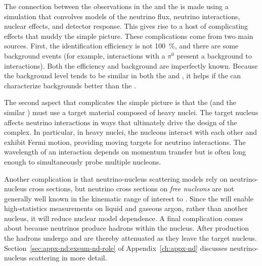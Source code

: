 The connection between the observations in the  and the  is made using a simulation that convolves models of the neutrino flux, neutrino interactions, nuclear effects, and detector response.
This gives rise to a host of complicating effects that 
muddy the simple picture. These complications come from two main sources. First, the identification efficiency is not \SI{100}{\%}, and there are
some background events (for example,  interactions with a $\pi^0$ present %
a background to \nue {} interactions). Both the efficiency and background are imperfectly known. 
Because the background level tends to be similar in both the  and , it helps if the  can characterize backgrounds better than the . 

The second aspect that complicates the simple picture is that the  (and the similar ) must use a target material composed of heavy nuclei. %
The target nucleus affects %
neutrino interactions in ways that ultimately drive the design of the   complex. In particular, in heavy nuclei, the nucleons interact with each other and exhibit Fermi motion, providing moving targets for neutrino interactions. 
The wavelength of an interaction %
depends on momentum transfer but is often long enough to simultaneously probe multiple nucleons. 


Another complication is that neutrino-nucleus scattering models rely on neutrino-nucleus cross sections, but neutrino cross sections on \textit{free nucleons} are not generally well known in the kinematic range of interest to .  
Since the  will enable high-statistics measurements on liquid and gaseous argon, rather than another nucleus, it will reduce nuclear model dependence. 
 A final complication comes about because neutrinos produce hadrons within the nucleus. After production the hadrons undergo  and are thereby attenuated as they leave the target nucleus. Section~\ref{sec:appx-nd:exsum-nd-role} of Appendix~\ref{ch:appx-nd} discusses neutrino-nucleus scattering in more detail. %

